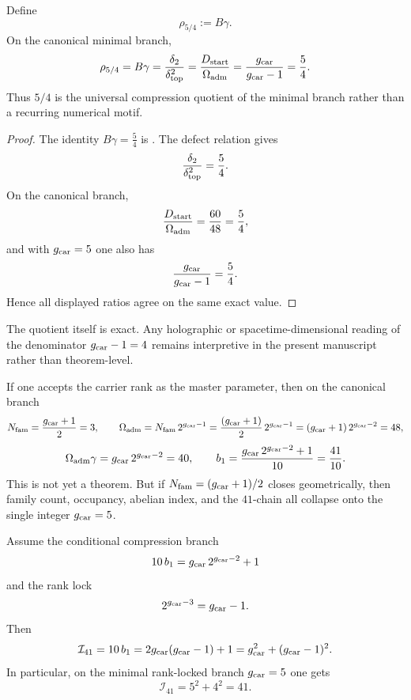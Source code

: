 \begin{lemma}
\label{lem:universal-5-4-compression}
Define
\[
\rho_{5/4}:=B\gamma.
\]
On the canonical minimal branch,
\[
\rho_{5/4}
=
B\gamma
=
\frac{\delta_2}{\delta_{\mathrm{top}}^2}
=
\frac{D_{\mathrm{start}}}{\Omega_{\mathrm{adm}}}
=
\frac{g_{\mathrm{car}}}{g_{\mathrm{car}}-1}
=
\frac54.
\]
Thus $5/4$ is the universal compression quotient of the minimal branch rather than a recurring numerical motif.
\end{lemma}

\begin{proof}
The identity $B\gamma=\frac54$ is . The defect relation gives
\[
\frac{\delta_2}{\delta_{\mathrm{top}}^2}=\frac54.
\]
On the canonical branch,
\[
\frac{D_{\mathrm{start}}}{\Omega_{\mathrm{adm}}}=\frac{60}{48}=\frac54,
\]
and with $g_{\mathrm{car}}=5$ one also has
\[
\frac{g_{\mathrm{car}}}{g_{\mathrm{car}}-1}=\frac{5}{4}.
\]
Hence all displayed ratios agree on the same exact value.
\end{proof}

\begin{remark}
The quotient itself is exact. Any holographic or spacetime-dimensional reading of the denominator $g_{\mathrm{car}}-1=4$ remains interpretive in the present manuscript rather than theorem-level.
\end{remark}

\begin{remark}
If one accepts the carrier rank as the master parameter, then on the canonical branch
\[
N_{\mathrm{fam}}=\frac{g_{\mathrm{car}}+1}{2}=3,
\qquad
\Omega_{\mathrm{adm}}=N_{\mathrm{fam}}\,2^{g_{\mathrm{car}}-1}=\frac{(g_{\mathrm{car}}+1)}{2}\,2^{g_{\mathrm{car}}-1}=(g_{\mathrm{car}}+1)\,2^{g_{\mathrm{car}}-2}=48,
\]
\[
\Omega_{\mathrm{adm}}\gamma=g_{\mathrm{car}}\,2^{g_{\mathrm{car}}-2}=40,
\qquad
b_1=\frac{g_{\mathrm{car}}\,2^{g_{\mathrm{car}}-2}+1}{10}=\frac{41}{10}.
\]
This is not yet a theorem. But if $N_{\mathrm{fam}}=(g_{\mathrm{car}}+1)/2$ closes geometrically, then family count, occupancy, abelian index, and the $41$-chain all collapse onto the single integer $g_{\mathrm{car}}=5$.
\end{remark}

\begin{corollary}
\label{cor:pythagorean-integrity-index}
Assume the conditional compression branch
\[
10\,b_1=g_{\mathrm{car}}\,2^{g_{\mathrm{car}}-2}+1
\]
and the rank lock
\[
2^{g_{\mathrm{car}}-3}=g_{\mathrm{car}}-1.
\]
Then
\[
\mathcal I_{41}
=
10\,b_1
=
2g_{\mathrm{car}}(g_{\mathrm{car}}-1)+1
=
g_{\mathrm{car}}^2+(g_{\mathrm{car}}-1)^2.
\]
In particular, on the minimal rank-locked branch $g_{\mathrm{car}}=5$ one gets
\[
\mathcal I_{41}=5^2+4^2=41.
\]
\end{corollary}


